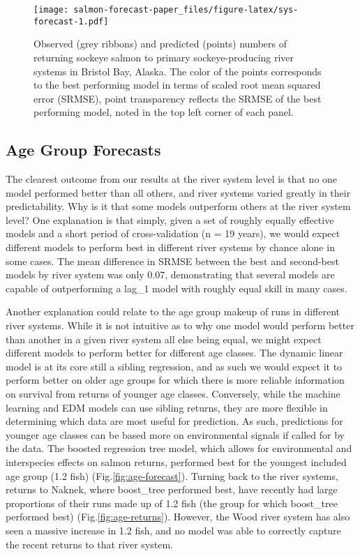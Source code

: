 \documentclass[
]{article}
\begin{document}
\begin{figure}
\centering
\texttt{[image: salmon-forecast-paper\_files/figure-latex/sys-forecast-1.pdf]}
\caption{\label{fig:sys-forecast}Observed (grey ribbons) and predicted (points) numbers of returning sockeye salmon to primary sockeye-producing river systems in Bristol Bay, Alaska. The color of the points corresponds to the best performing model in terms of scaled root mean squared error (SRMSE), point transparency reflects the SRMSE of the best performing model, noted in the top left corner of each panel.}
\end{figure}

\hypertarget{age-group-forecasts}{%
\subsection*{Age Group Forecasts}\label{age-group-forecasts}}

The clearest outcome from our results at the river system level is that no one model performed better than all others, and river systems varied greatly in their predictability. Why is it that some models outperform others at the river system level? One explanation is that simply, given a set of roughly equally effective models and a short period of cross-validation (n = 19 years), we would expect different models to perform best in different river systems by chance alone in some cases. The mean difference in SRMSE between the best and second-best models by river system was only 0.07, demonstrating that several models are capable of outperforming a lag\_1 model with roughly equal skill in many cases.

Another explanation could relate to the age group makeup of runs in different river systems. While it is not intuitive as to why one model would perform better than another in a given river system all else being equal, we might expect different models to perform better for different age classes. The dynamic linear model is at its core still a sibling regression, and as such we would expect it to perform better on older age groups for which there is more reliable information on survival from returns of younger age classes. Conversely, while the machine learning and EDM models can use sibling returns, they are more flexible in determining which data are most useful for prediction. As such, predictions for younger age classes can be based more on environmental signals if called for by the data. The boosted regression tree model, which allows for environmental and interspecies effects on salmon returns, performed best for the youngest included age group (1.2 fish) (Fig.\ref{fig:age-forecast}). Turning back to the river systems, returns to Naknek, where boost\_tree performed best, have recently had large proportions of their runs made up of 1.2 fish (the group for which boost\_tree performed best) (Fig.\ref{fig:age-returns}). However, the Wood river system has also seen a massive increase in 1.2 fish, and no model was able to correctly capture the recent returns to that river system.
\end{document}
